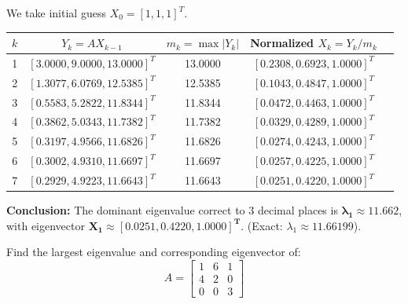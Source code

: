 \documentclass[11pt,a4paper]{article}
\begin{document}
\begin{solbox}
We take initial guess $X_0 = [1, 1, 1]^T$.
\begin{center}
\small
\begin{tabular}{ccccc}
    \toprule
    $k$ & $Y_k = A X_{k-1}$ & $m_k = \max |Y_k|$ & Normalized $X_k = Y_k / m_k$ \\
    \midrule
    1 & $[3.0000, 9.0000, 13.0000]^T$ & 13.0000 & $[0.2308, 0.6923, 1.0000]^T$ \\
    2 & $[1.3077, 6.0769, 12.5385]^T$ & 12.5385 & $[0.1043, 0.4847, 1.0000]^T$ \\
    3 & $[0.5583, 5.2822, 11.8344]^T$ & 11.8344 & $[0.0472, 0.4463, 1.0000]^T$ \\
    4 & $[0.3862, 5.0343, 11.7382]^T$ & 11.7382 & $[0.0329, 0.4289, 1.0000]^T$ \\
    5 & $[0.3197, 4.9566, 11.6826]^T$ & 11.6826 & $[0.0274, 0.4243, 1.0000]^T$ \\
    6 & $[0.3002, 4.9310, 11.6697]^T$ & 11.6697 & $[0.0257, 0.4225, 1.0000]^T$ \\
    7 & $[0.2929, 4.9223, 11.6643]^T$ & 11.6643 & $[0.0251, 0.4220, 1.0000]^T$ \\
    \bottomrule
\end{tabular}
\end{center}
\textbf{Conclusion:} The dominant eigenvalue correct to 3 decimal places is $\mathbf{\lambda_1 \approx 11.662}$, with eigenvector $\mathbf{X_1 \approx [0.0251, 0.4220, 1.0000]^T}$. (Exact: $\lambda_1 \approx 11.66199$).
\end{solbox}

\begin{exambox}
Find the largest eigenvalue and corresponding eigenvector of:
$$A = \begin{bmatrix} 1 & 6 & 1 \\ 4 & 2 & 0 \\ 0 & 0 & 3 \end{bmatrix}$$
\end{exambox}
\end{document}
